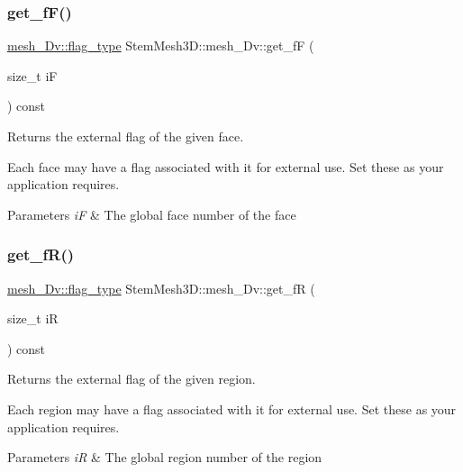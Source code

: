 \subsubsection{\texorpdfstring{get\+\_\+f\+F()}{get\_fF()}}
{\footnotesize\ttfamily \hyperlink{classStemMesh3D_1_1mesh__3Dv_a9544cba555b60f17f04fcd1689314338}{mesh\+\_\+Dv\+::flag\+\_\+type} Stem\+Mesh3\+D\+::mesh\+\_\+Dv\+::get\+\_\+fF (\begin{DoxyParamCaption}\item[{size\+\_\+t}]{iF }\end{DoxyParamCaption}) const}



Returns the external flag of the given face. 

Each face may have a flag associated with it for external use. Set these as your application requires. 
\begin{DoxyParams}{Parameters}
{\em iF} & The global face number of the face \\
\hline
\end{DoxyParams}
\mbox{\label{classStemMesh3D_1_1mesh__3Dv_a3274375ccd0ac08edeadd853fef5f800}} 
\subsubsection{\texorpdfstring{get\+\_\+f\+R()}{get\_fR()}}
{\footnotesize\ttfamily \hyperlink{classStemMesh3D_1_1mesh__3Dv_a9544cba555b60f17f04fcd1689314338}{mesh\+\_\+Dv\+::flag\+\_\+type} Stem\+Mesh3\+D\+::mesh\+\_\+Dv\+::get\+\_\+fR (\begin{DoxyParamCaption}\item[{size\+\_\+t}]{iR }\end{DoxyParamCaption}) const}



Returns the external flag of the given region. 

Each region may have a flag associated with it for external use. Set these as your application requires. 
\begin{DoxyParams}{Parameters}
{\em iR} & The global region number of the region \\
\hline
\end{DoxyParams}
\mbox{\label{classStemMesh3D_1_1mesh__3Dv_a6836854df501ef92c61508ffe72cba53}} 

